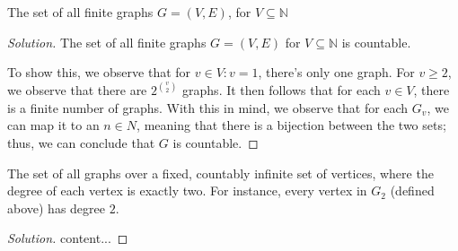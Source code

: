 \documentclass{article}
\newenvironment{solution}{\begin{proof}[Solution]}{\end{proof}}
\newcommand{\NN}{\mathbb{N}}
\begin{document}
\begin{hw}
	The set of all finite graphs $G = (V, E)$, for $V \subseteq \mathbb{N}$
\end{hw}
\begin{solution}
	The set of all finite graphs $G = (V, E)$ for $V \subseteq \NN$ is countable.
	
	To show this, we observe that for $v \in V : v = 1$, there's only one graph. For $v \geq 2$, we observe that there are $2^{\binom{v}{2}}$ graphs. It then follows that for each $v \in V$, there is a finite number of graphs. With this in mind, we observe that for each $G_{v}$, we can map it to an $n \in N$, meaning that there is a bijection between the two sets; thus, we can conclude that $G$ is countable.
\end{solution}

\begin{hw}
	The set of all graphs over a fixed, countably infinite set of vertices, where the degree of each vertex is exactly two. For instance, every vertex in $G_2$ (defined above) has degree $2$.
\end{hw}
\begin{solution}
	content...
\end{solution}
\end{document}

